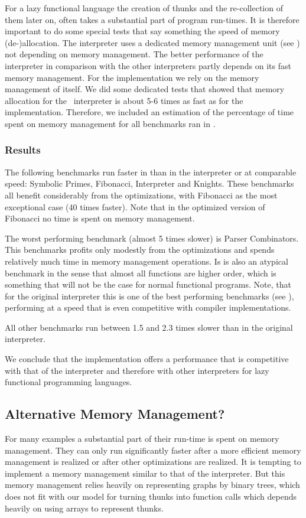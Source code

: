 For a lazy functional language the creation of thunks and the re-collection of them later on, 
often takes a substantial part of program run-times.
It is therefore important to do some special tests that say something the speed of memory (de-)allocation.
The \Sapl interpreter uses a dedicated memory management unit (see \cite{JKP}) not depending on \Java memory management. 
The better performance of the \Sapl interpreter in comparison with the other interpreters partly depends on its fast memory management.
For the \JS implementation we rely on  the memory management of \JS itself.
We did some dedicated tests that showed that memory allocation for 
the \Java\ \Sapl interpreter is about 5-6 times as fast as for the \JS implementation.
Therefore, we included an estimation of the percentage of time spent on memory management for all benchmarks ran in \Sapljs.

\subsubsection{Results}
The following benchmarks run faster in \Sapljs than in the \Sapl interpreter or at comparable 
speed: \textsf{Symbolic Primes}, \textsf{Fibonacci}, \textsf{Interpreter} and \textsf{Knights}. These 
benchmarks all benefit considerably from the optimizations, with \textsf{Fibonacci} as the most 
exceptional case (40 times faster).
Note that in the optimized version of \textsf{Fibonacci} no time is spent on memory management.

The worst performing benchmark (almost 5 times slower) is \textsf{Parser Combinators}. 
This benchmarks profits only modestly  from the optimizations and spends relatively much time 
in memory management operations. Is is also an atypical benchmark in the sense that almost all 
functions are higher order, which is something that will not be the case for
normal functional programs. Note, that for the original \Sapl interpreter this is one of the best 
performing benchmarks (see \cite{JKP}), 
performing at a speed that is even competitive with compiler implementations. 

All other benchmarks run between 1.5 and 2.3 times slower than in the original \Sapl interpreter.

We conclude that  the \Sapljs implementation offers a performance that is competitive with that of the 
\Sapl interpreter and therefore
with other interpreters for lazy functional programming languages.


\subsection{Alternative Memory Management?}
For many \Sapljs examples a substantial part of their run-time is spent on memory management. 
They can only run significantly faster after a more efficient memory management is realized or after other optimizations are realized.
It is tempting to implement a memory management similar to that of the \Sapl interpreter. 
But this memory management relies heavily on representing graphs by binary trees, 
which does not fit with our model for turning thunks into \JS function calls which depends heavily on using arrays to
represent thunks.

